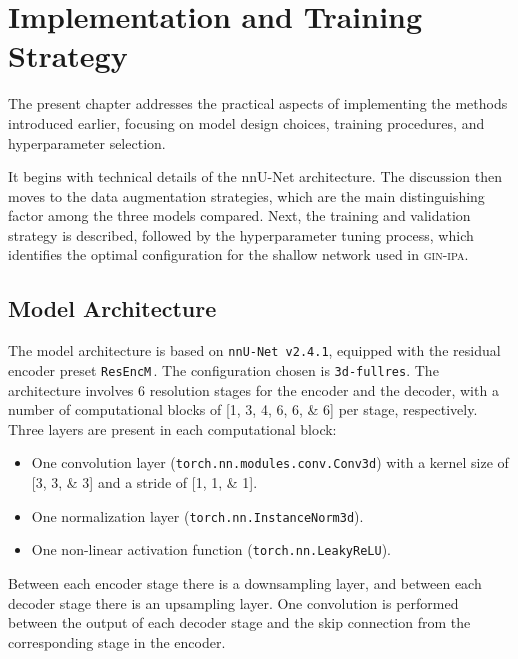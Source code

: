 \chapter{Implementation and Training Strategy} \label{chap:ImplementationAndTrainingStrategy}
\vspace{1cm}

The present chapter addresses the practical aspects of implementing the methods introduced earlier, focusing on model design choices, training procedures, and hyperparameter selection.

It begins with technical details of the nnU-Net architecture. The discussion then moves to the data augmentation strategies, which are the main distinguishing factor among the three models compared. Next, the training and validation strategy is described, followed by the hyperparameter tuning process, which identifies the optimal configuration for the shallow network used in \textsc{gin-ipa}.

\section{Model Architecture} \label{sec:ModelArchitecture}
The model architecture is based on \texttt{nnU-Net v2.4.1}, equipped with the residual encoder preset \texttt{ResEncM}\,\cite{Isensee2024}. The configuration chosen is \texttt{3d-fullres}. The architecture involves \num{6} resolution stages for the encoder and the decoder, with a number of computational blocks of [\numlist[list-final-separator = {, }]{1;3;4;6;6;6}] per stage, respectively. Three layers are present in each computational block:
\begin{itemize}
    \item One convolution layer (\texttt{torch.nn.modules.conv.Conv3d}) with a kernel size of [\numlist[list-final-separator = {, }]{3;3;3}] and a stride of [\numlist[list-final-separator = {, }]{1;1;1}].
    \item One normalization layer (\texttt{torch.nn.InstanceNorm3d}).
    \item One non-linear activation function (\texttt{torch.nn.LeakyReLU}).
\end{itemize}
Between each encoder stage there is a downsampling layer, and between each decoder stage there is an upsampling layer. One convolution is performed between the output of each decoder stage and the skip connection from the corresponding stage in the encoder.

